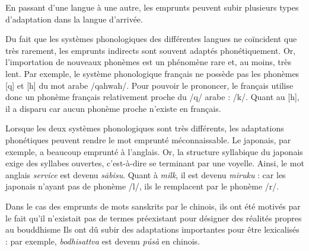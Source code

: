 En passant d’une langue à une autre, les emprunts peuvent subir plusieurs types d’adaptation dans la langue d’arrivée.

Du fait que les systèmes phonologiques des différentes langues ne coïncident que très rarement, les emprunts indirects sont souvent adaptés phonétiquement. Or, l’importation de nouveaux phonèmes est un phénomène rare et, au moins, très lent. Par exemple, le système phonologique français ne possède pas les phonèmes [q] et [h] du mot arabe /qahwah/. Pour pouvoir le prononcer, le français utilise donc un phonème français relativement proche du /q/ arabe : /k/. Quant au [h], il a disparu car aucun phonème proche n’existe en français.

Lorsque les deux systèmes phonologiques sont très différents, les adaptations phonétiques peuvent rendre le mot emprunté méconnaissable. Le japonais, par exemple, a beaucoup emprunté à l’anglais. Or, la structure syllabique du japonais exige des syllabes ouvertes, c’est-à-dire se terminant par une voyelle. Ainsi, le mot anglais \textit{service} est devenu \textit{sābisu}. Quant à \textit{milk}, il est devenu \textit{miruku} : car les japonais n’ayant pas de phonème /l/, ils le remplacent par le phonème /r/.

Dans le cas des emprunts de mots sanskrits par le chinois, ils ont été motivés par le fait qu’il n’existait pas de termes préexistant pour désigner des réalités propres au bouddhisme Ils ont dû subir des adaptations importantes pour être lexicalisés : par exemple, \textit{bodhisattva} est devenu \textit{púsà} \bipa{[pʰusa]} en chinois.

